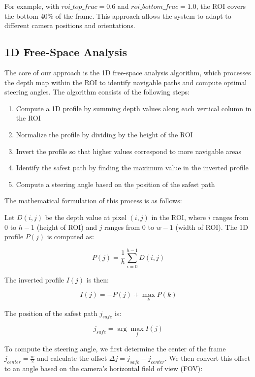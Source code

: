 \documentclass[conference]{IEEEtran}
\begin{document}
For example, with $roi\_top\_frac = 0.6$ and $roi\_bottom\_frac = 1.0$, the ROI covers the bottom 40\% of the frame. This approach allows the system to adapt to different camera positions and orientations.

\subsection{1D Free-Space Analysis}
The core of our approach is the 1D free-space analysis algorithm, which processes the depth map within the ROI to identify navigable paths and compute optimal steering angles. The algorithm consists of the following steps:

\begin{enumerate}
\item Compute a 1D profile by summing depth values along each vertical column in the ROI
\item Normalize the profile by dividing by the height of the ROI
\item Invert the profile so that higher values correspond to more navigable areas
\item Identify the safest path by finding the maximum value in the inverted profile
\item Compute a steering angle based on the position of the safest path
\end{enumerate}

The mathematical formulation of this process is as follows:

Let $D(i,j)$ be the depth value at pixel $(i,j)$ in the ROI, where $i$ ranges from 0 to $h-1$ (height of ROI) and $j$ ranges from 0 to $w-1$ (width of ROI). The 1D profile $P(j)$ is computed as:

\begin{equation}
P(j) = \frac{1}{h}\sum_{i=0}^{h-1}D(i,j)
\end{equation}

The inverted profile $I(j)$ is then:

\begin{equation}
I(j) = -P(j) + \max_{k}P(k)
\end{equation}

The position of the safest path $j_{safe}$ is:

\begin{equation}
j_{safe} = \arg\max_{j}I(j)
\end{equation}

To compute the steering angle, we first determine the center of the frame $j_{center} = \frac{w}{2}$ and calculate the offset $\Delta j = j_{safe} - j_{center}$. We then convert this offset to an angle based on the camera's horizontal field of view (FOV):
\end{document}
